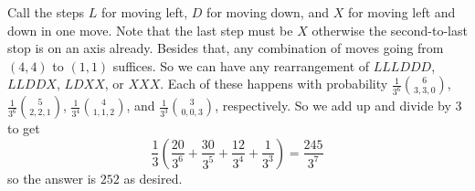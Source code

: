 Call the steps $L$ for moving left, $D$ for moving down, and $X$ for moving left and down in one move. Note that the last step must be $X$ otherwise the second-to-last stop is on an axis already. Besides that, any combination of moves going from $\left(4,4\right)$ to $\left(1,1\right)$ suffices. So we can have any rearrangement of $LLLDDD$, $LLDDX$, $LDXX$, or $XXX$. Each of these happens with probability $\frac{1}{3^6}\binom{6}{3,3,0}$, $\frac{1}{3^6}\binom{5}{2,2,1}$, $\frac{1}{3^4}\binom{4}{1,1,2}$, and $\frac{1}{3^3}\binom{3}{0,0,3}$, respectively. So we add up and divide by $3$ to get \[\frac{1}{3}\left(\frac{20}{3^6}+\frac{30}{3^5}+\frac{12}{3^4}+\frac{1}{3^3}\right)=\frac{245}{3^7}\] so the answer is $\boxed{252}$ as desired.